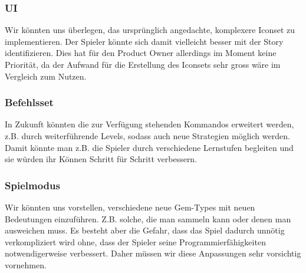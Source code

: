 \documentclass[11pt,a4paper,titlepage]{article}
\begin{document}
\subsubsection{UI}
Wir könnten uns überlegen, das ursprünglich angedachte, komplexere Iconset zu implementieren. Der Spieler könnte sich damit vielleicht besser mit der Story identifizieren. Dies hat für den Product Owner allerdings im Moment keine Priorität, da der Aufwand für die Erstellung des Iconsets sehr gross wäre im Vergleich zum Nutzen.

\subsubsection{Befehlsset}
In Zukunft könnten die zur Verfügung stehenden Kommandos erweitert werden, z.B. durch weiterführende Levels, sodass auch neue Strategien möglich werden. Damit könnte man z.B. die Spieler durch verschiedene Lernstufen begleiten und sie würden ihr Können Schritt für Schritt verbessern.

\subsubsection{Spielmodus}
Wir könnten uns vorstellen, verschiedene neue Gem-Types mit neuen Bedeutungen einzuführen. Z.B. solche, die man sammeln kann oder denen man ausweichen muss. Es besteht aber die Gefahr, dass das Spiel dadurch unnötig verkompliziert wird ohne, dass der Spieler seine Programmierfähigkeiten notwendigerweise verbessert. Daher müssen wir diese Anpassungen sehr vorsichtig vornehmen.

\newpage



\begin{otherlanguage}{german}
\printbibliography
\end{otherlanguage}

\begin{otherlanguage}{german}
\listoffigures
\end{otherlanguage}
\end{document}
